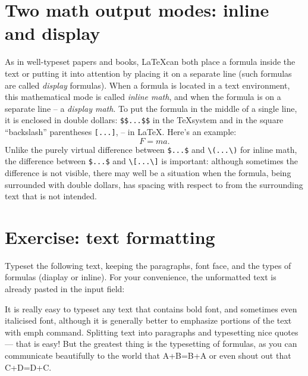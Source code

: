 {\section{Two math output modes: inline and display}
\par As in well-typeset papers and books, \LaTeX can both place a formula inside the text or putting it into attention by placing it on a separate line (such formulas are called \emph{display} formulas). When a formula is located in a text environment, this mathematical mode is called \emph{inline math}, and when the formula is on a separate line -- a \emph{display math}. To put the formula in the middle of a single line, it is enclosed in double dollars: \verb"$$...$$" in the \TeX system and in the square ``backslash'' parentheses \verb"[...]", -- in \LaTeX. Here’s an example: \[F=ma.\]
Unlike the purely virtual difference between \verb"$...$" and \verb"\(...\)" for inline math, the difference between \verb"$...$" and \verb"\[...\]" is important: although sometimes the difference is not visible, there may well be a situation when the formula, being surrounded with double dollars, has spacing with respect to from the surrounding text that is not intended.

\section{Exercise: text formatting}
\begin{staticpart}
Typeset the following text, keeping the paragraphs, font face, and the types of formulas (diaplay or inline). For your convenience, the unformatted text is already pasted in the input field:
\end{staticpart}
It is really easy to typeset any text that contains bold font, and sometimes even italicised font, although it is generally better to emphasize portions of the text with emph command. Splitting text into paragraphs and typesetting nice quotes --- that is easy! But the greatest thing is the typesetting of formulas, as you can communicate beautifully to the world that A+B=B+A or even shout out that C+D=D+C.


}
